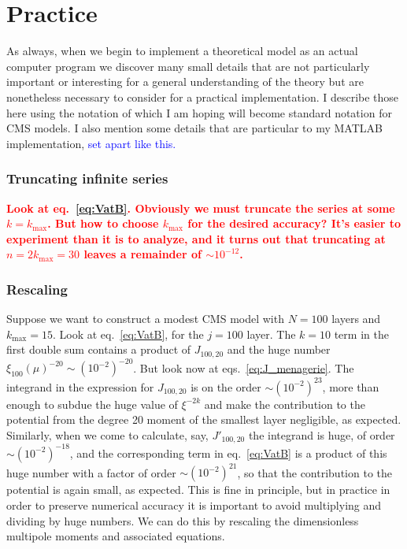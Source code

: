 \documentclass[amsmath,amsfonts,rmp,letterpaper]{revtex4}
\newcommand{\sub}[1]{_{\text{#1}}} %
\newcommand{\about}{\sim\!}
\newcommand{\red}[1]{\textbf{\textcolor{red}{#1}}}
\newcommand{\kmax}{k\sub{max}}
\newcommand{\ML}[1]{{\textcolor{blue}{#1}}}
\begin{document}

\section{Practice\label{part:practice}}
As always, when we begin to implement a theoretical model as an actual computer
program we discover many small details that are not particularly important or
interesting for a general understanding of the theory but are nonetheless
necessary to consider for a practical implementation. I describe those here using
the notation of \citet{Hubbard2013} which I am hoping will become standard
notation for CMS models. I also mention some details that are particular to my
MATLAB implementation, \ML{set apart like this.}

\subsubsection{Truncating infinite series}

\red{Look at eq.~\eqref{eq:VatB}. Obviously we must truncate the series at some
$k=\kmax$. But how to choose $\kmax$ for the desired accuracy? It's easier to
experiment than it is to analyze, and it turns out that truncating at
$n=2\kmax=30$ leaves a remainder of $\about{10^{-12}}$.}

\subsubsection{Rescaling}

Suppose we want to construct a modest CMS model with $N=100$ layers and
$\kmax=15$. Look at eq.~\eqref{eq:VatB}, for the $j=100$ layer. The $k=10$ term in
the first double sum contains a product of $J_{100,20}$ and the huge number
$\xi_{100}(\mu)^{-20}\sim(10^{-2})^{-20}$. But look now at
eqs.~\eqref{eq:J_menagerie}. The integrand in the expression for $J_{100,20}$ is
on the order $\about(10^{-2})^{23}$, more than enough to subdue the huge value of
$\xi^{-2k}$ and make the contribution to the potential from the degree 20 moment
of the smallest layer negligible, as expected. Similarly, when we come to
calculate, say, $J'_{100,20}$ the integrand is huge, of order
$\about{}(10^{-2})^{-18}$, and the corresponding term in eq.~\eqref{eq:VatB}
is a product of this huge number with a factor of order $\about{}(10^{-2})^{21}$,
so that the contribution to the potential is again small, as expected. This is
fine in principle, but in practice in order to preserve numerical accuracy it is
important to avoid multiplying and dividing by huge numbers. We can do this by
rescaling the dimensionless multipole moments and associated equations.
\end{document}
